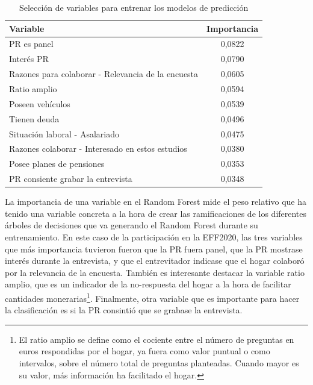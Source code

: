 \begin{table}[ht]
    \centering
    \begin{tabular}{lc}
    \hline
        \textbf{Variable} & \textbf{Importancia} \\ \hline
        PR es panel & 0,0822 \\ 
        Interés PR & 0,0790 \\ 
        Razones para colaborar - Relevancia de la encuesta & 0,0605 \\ 
        Ratio amplio & 0,0594 \\ 
        Poseen vehículos & 0,0539 \\ 
        Tienen deuda & 0,0496 \\ 
        Situación laboral - Asalariado & 0,0475 \\ 
        Razones colaborar - Interesado en estos estudios & 0,0380 \\ 
        Posee planes de pensiones & 0,0353 \\ 
        PR consiente grabar la entrevista & 0,0348 \\ \hline
    \end{tabular}
    \caption{Selección de variables para entrenar los modelos de predicción}
\end{table}

La importancia de una variable en el Random Forest mide el peso relativo que ha tenido una variable concreta a la hora de crear las ramificaciones de los diferentes árboles de decisiones que va generando el Random Forest durante su entrenamiento. En este caso de la participación en la EFF2020, las tres variables que más importancia tuvieron fueron que la PR fuera panel, que la PR mostrase interés durante la entrevista, y que el entrevitador indicase que el hogar colaboró por la relevancia de la encuesta. También es interesante destacar la variable ratio amplio, que es un indicador de la no-respuesta del hogar a la hora de facilitar cantidades monerarias\footnote{El ratio amplio se define como el cociente entre el número de preguntas en euros respondidas por el hogar, ya fuera como valor puntual o como intervalos, sobre el número total de preguntas planteadas. Cuando mayor es su valor, más información ha facilitado el hogar.}. Finalmente, otra variable que es importante para hacer la clasificación es si la PR consintió que se grabase la entrevista.